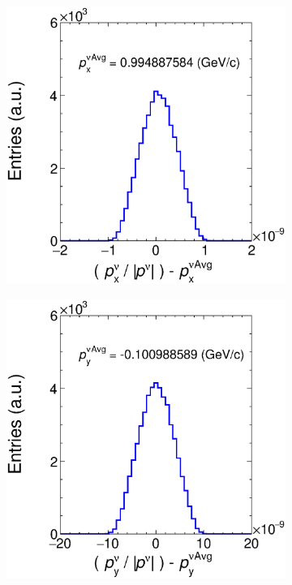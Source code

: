 \begin{figure}[t]
     \centering
     \begin{subfigure}[b]{0.32\textwidth}
         \centering
         \includegraphics[width=\textwidth]{figures/ch6-TKI/Properties/NupxNorm.eps}
         \caption{}
         \label{fig:NupxNorm}
     \end{subfigure}
     \begin{subfigure}[b]{0.32\textwidth}
         \centering
         \includegraphics[width=\textwidth]{figures/ch6-TKI/Properties/NupyNorm.eps}

\end{subfigure}
\end{figure}
